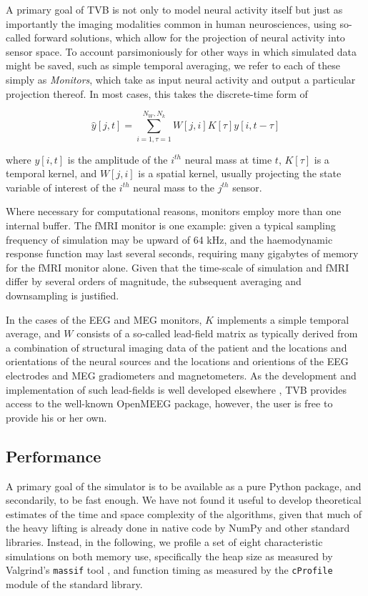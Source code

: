 	A primary goal of TVB is not only to model neural activity itself
	but just as importantly the imaging modalities common in human 
	neurosciences, using so-called forward solutions, which allow for
	the projection of neural activity into sensor space. To account
	parsimoniously for other ways in which simulated data might be saved, 
	such as simple temporal averaging, we refer to each of these simply as 
	\textit{Monitors}, which take as input neural activity and 
	output a particular projection thereof. In most cases, this 
	takes the discrete-time form of

	\[ \hat{y}[j, t] = \sum_{i=1, \tau=1}^{N_W, N_k} W[j, i] K[\tau] y[i, t-\tau] \]

	\noindent where $y[i, t]$ is the amplitude of the $i^{th}$ neural mass at time
	$t$, $K[\tau]$ is a temporal kernel, and $W[j, i]$ is a spatial kernel,
	usually projecting the state variable of interest of the $i^{th}$ 
	neural mass to the $j^{th}$ sensor. 

	Where necessary for computational reasons, monitors employ more than 
	one internal buffer. The fMRI monitor is one 
	example: given a typical sampling frequency of simulation may be upward of 
	64 kHz, and the haemodynamic response function may last several seconds, 
	requiring many gigabytes of memory for the fMRI monitor alone. Given that 
	the time-scale of simulation and fMRI differ by several orders of magnitude, 
	the subsequent averaging and downsampling is justified. 

	In the cases of the EEG and MEG monitors, $K$ implements a simple
	temporal average, and $W$ consists of a so-called lead-field matrix as typically
	derived from a combination of structural imaging data of the patient 
	and the locations and orientations of the neural sources and the locations
	and orientions of the EEG electrodes and MEG gradiometers and magnetometers. 
	As the development and implementation of such lead-fields is well developed
	elsewhere \cite{Jirsa_2002,Nolte2003,Gramfort_2010}, TVB provides access
	to the well-known OpenMEEG package, however, the user is free to provide 
	his or her own.

\subsection{Performance}

	A primary goal of the simulator is to be available as a pure Python package,
	and secondarily, to be fast enough. We have not found it useful to 
	develop theoretical estimates of the time and space complexity of the 
	algorithms, given that much of the heavy lifting is already done in native
	code by NumPy and other standard libraries. Instead, 
	in the following, we profile a set of eight characteristic simulations
	on both memory use, specifically the heap size as measured by Valgrind's 
	\texttt{massif} tool \cite{valgrind2007}, and function timing as measured by the 
	\texttt{cProfile} module of the standard library. 
	
